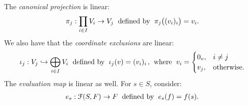     \begin{example}
        The \textit{canonical projection} is linear:
            \begin{equation*}
            \begin{split}
                \pi_j: \prod_{i \in I}V_i \rightarrow V_j \hspace{6pt}\text{defined by}\hspace{6pt} \pi_j\bigl((v_i)_i\bigr) = v_i.
            \end{split}
            \end{equation*}
        We also have that the \textit{coordinate exclusions} are linear:
            \begin{equation*}
            \begin{split}
                \iota_j: V_j \hookrightarrow \bigoplus_{i \in I}V_i \mtext{defined by} \iota_j(v) = (v_i)_i \hspace{1.5pt}, \hspace{-2pt}\mtext{where} v_i = \begin{cases}
                    0_v, &i \neq j \\
                    v_j, &\text{otherwise}.
                \end{cases}
            \end{split}
            \end{equation*}
        The \textit{evaluation map} is linear as well. For $s \in S$, consider:
            \begin{equation*}
            \begin{split}
                e_s : \mathcal{F}(S,F) \rightarrow F \hspace{6pt}\text{defined by}\hspace{6pt} e_s(f) = f(s).
            \end{split}
            \end{equation*}
    \end{example}

